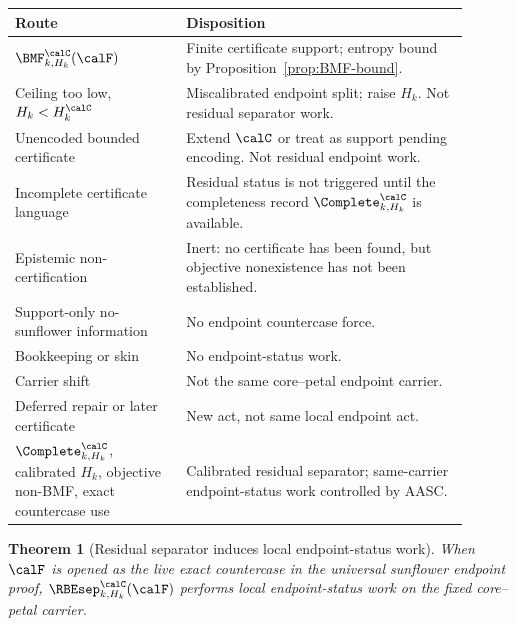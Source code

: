 \documentclass[11pt]{article}
\newtheorem{theorem}{Theorem}[section]
\begin{document}
\begin{center}
\begin{tabular}{p{0.34\linewidth}p{0.56\linewidth}}
\toprule
Route & Disposition\\
\midrule
\(\BMF^{\calC}_{k,H_k}(\calF)\) & Finite certificate support; entropy bound by Proposition~\ref{prop:BMF-bound}.\\
Ceiling too low, \(H_k<H_k^{\calC}\) & Miscalibrated endpoint split; raise \(H_k\).  Not residual separator work.\\
Unencoded bounded certificate & Extend \(\calC\) or treat as support pending encoding.  Not residual endpoint work.\\
Incomplete certificate language & Residual status is not triggered until the completeness record \(\Complete^{\calC}_{k,H_k}\) is available.\\
Epistemic non-certification & Inert: no certificate has been found, but objective nonexistence has not been established.\\
Support-only no-sunflower information & No endpoint countercase force.\\
Bookkeeping or skin & No endpoint-status work.\\
Carrier shift & Not the same core--petal endpoint carrier.\\
Deferred repair or later certificate & New act, not same local endpoint act.\\
\(\Complete^{\calC}_{k,H_k}\), calibrated \(H_k\), objective non-BMF, exact countercase use & Calibrated residual separator; same-carrier endpoint-status work controlled by AASC.\\
\bottomrule
\end{tabular}
\end{center}

\begin{theorem}[Residual separator induces local endpoint-status work]\label{thm:RBE-status}
When \(\calF\) is opened as the live exact countercase in the universal sunflower endpoint proof, \(\RBEsep^{\calC}_{k,H_k}(\calF)\) performs local endpoint-status work on the fixed core--petal carrier.
\end{theorem}
\end{document}
